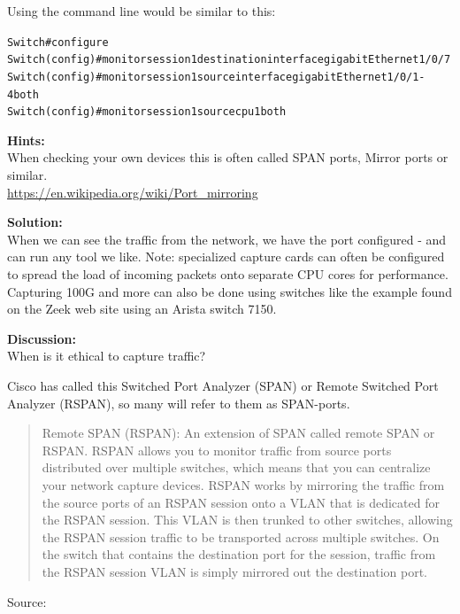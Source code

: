 \documentclass[a4paper,11pt,notitlepage]{report}
\begin{document}
Using the command line would be similar to this:
\begin{alltt}\footnotesize
Switch#configure
Switch(config)#monitor session 1 destination interface gigabitEthernet 1/0/7
Switch(config)#monitor session 1 source interface gigabitEthernet 1/0/1-4 both
Switch(config)#monitor session 1 source cpu 1 both
\end{alltt}



{\bf Hints:}\\
When checking your own devices this is often called SPAN ports, Mirror ports or similar.\\
\url{https://en.wikipedia.org/wiki/Port_mirroring}



{\bf Solution:}\\
When we can see the traffic from the network, we have the port configured - and can run any tool we like. Note: specialized capture cards can often be configured to spread the load of incoming packets onto separate CPU cores for performance. Capturing 100G and more can also be done using switches like the example found on the Zeek web site using an Arista switch 7150.


{\bf Discussion:}\\
When is it ethical to capture traffic?

Cisco has called this Switched Port Analyzer (SPAN) or Remote Switched Port Analyzer (RSPAN), so many will refer to them as SPAN-ports.

\begin{quote}
Remote SPAN (RSPAN): An extension of SPAN called remote SPAN or RSPAN. RSPAN allows you to monitor traffic from source ports distributed over multiple switches, which means that you can centralize your network capture devices. RSPAN works by mirroring the traffic from the source ports of an RSPAN session onto a VLAN that is dedicated for the RSPAN session. This VLAN is then trunked to other switches, allowing the RSPAN session traffic to be transported across multiple switches. On the switch that contains the destination port for the session, traffic from the RSPAN session VLAN is simply mirrored out the destination port.
\end{quote}
Source: {\small{}}
\end{document}
